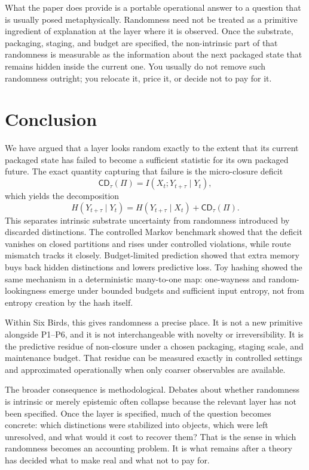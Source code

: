 \documentclass[11pt]{article}
\numberwithin{equation}{section}
\begin{document}
What the paper does provide is a portable operational answer to a question that is usually posed metaphysically. Randomness need not be treated as a primitive ingredient of explanation at the layer where it is observed. Once the substrate, packaging, staging, and budget are specified, the non-intrinsic part of that randomness is measurable as the information about the next packaged state that remains hidden inside the current one. You usually do not remove such randomness outright; you relocate it, price it, or decide not to pay for it.
 \section{Conclusion}\label{sec:conclusion}

We have argued that a layer looks random exactly to the extent that its current packaged state has failed to become a sufficient statistic for its own packaged future. The exact quantity capturing that failure is the micro-closure deficit
\[
\mathsf{CD}_\tau(\Pi)=I(X_t;Y_{t+\tau}\mid Y_t),
\]
which yields the decomposition
\[
H(Y_{t+\tau}\mid Y_t)=H(Y_{t+\tau}\mid X_t)+\mathsf{CD}_\tau(\Pi).
\]
This separates intrinsic substrate uncertainty from randomness introduced by discarded distinctions. The controlled Markov benchmark showed that the deficit vanishes on closed partitions and rises under controlled violations, while route mismatch tracks it closely. Budget-limited prediction showed that extra memory buys back hidden distinctions and lowers predictive loss. Toy hashing showed the same mechanism in a deterministic many-to-one map: one-wayness and random-lookingness emerge under bounded budgets and sufficient input entropy, not from entropy creation by the hash itself.

Within Six Birds, this gives randomness a precise place. It is not a new primitive alongside P1--P6, and it is not interchangeable with novelty or irreversibility. It is the predictive residue of non-closure under a chosen packaging, staging scale, and maintenance budget. That residue can be measured exactly in controlled settings and approximated operationally when only coarser observables are available.

The broader consequence is methodological. Debates about whether randomness is intrinsic or merely epistemic often collapse because the relevant layer has not been specified. Once the layer is specified, much of the question becomes concrete: which distinctions were stabilized into objects, which were left unresolved, and what would it cost to recover them? That is the sense in which randomness becomes an accounting problem. It is what remains after a theory has decided what to make real and what not to pay for.
 
\end{document}
